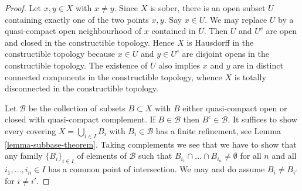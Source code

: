 \begin{proof}
Let $x, y \in X$ with $x \not = y$. Since $X$ is sober, there
is an open subset $U$ containing exactly one of the two points $x, y$.
Say $x \in U$. We may replace $U$ by a quasi-compact open
neighbourhood of $x$ contained in $U$. Then $U$ and $U^c$ are open and
closed in the constructible topology. Hence $X$ is Hausdorff in the
constructible topology because $x \in U$ and $y \in U^c$ are
disjoint opens in the constructible topology. The existence of $U$
also implies $x$ and $y$ are in distinct connected components in the
constructible topology, whence $X$ is totally disconnected in the
constructible topology.

\medskip\noindent
Let $\mathcal{B}$ be the collection of subsets $B \subset X$
with $B$ either quasi-compact open or closed with quasi-compact
complement. If $B \in \mathcal{B}$ then $B^c \in \mathcal{B}$.
It suffices to show every covering $X = \bigcup_{i \in I} B_i$
with $B_i \in \mathcal{B}$ has a finite refinement, see
Lemma \ref{lemma-subbase-theorem}.
Taking complements we see that we have to show that any family
$\{B_i\}_{i \in I}$ of elements of $\mathcal{B}$
such that $B_{i_1} \cap \ldots \cap B_{i_n} \not = \emptyset$
for all $n$ and all $i_1, \ldots, i_n \in I$
has a common point of intersection. We may and do assume
$B_i \not = B_{i'}$ for $i \not = i'$.


\end{proof}
